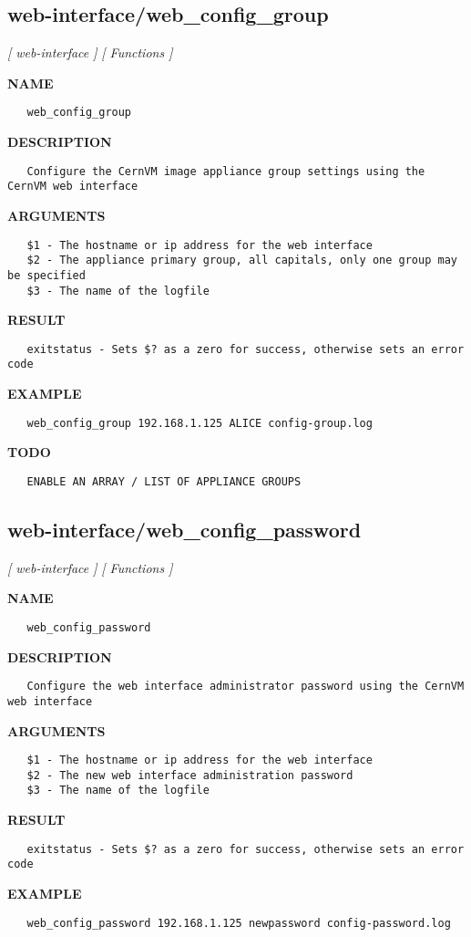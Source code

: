 \subsection{web-interface/web\_config\_group}
\textsl{[ web-interface ]}
\textsl{[ Functions ]}

\label{ch:robo73}
\label{ch:web_interface_web_config_group}
\textbf{NAME}
\begin{verbatim}
   web_config_group
\end{verbatim}
\textbf{DESCRIPTION}
\begin{verbatim}
   Configure the CernVM image appliance group settings using the CernVM web interface
\end{verbatim}
\textbf{ARGUMENTS}
\begin{verbatim}
   $1 - The hostname or ip address for the web interface
   $2 - The appliance primary group, all capitals, only one group may be specified
   $3 - The name of the logfile
\end{verbatim}
\textbf{RESULT}
\begin{verbatim}
   exitstatus - Sets $? as a zero for success, otherwise sets an error code
\end{verbatim}
\textbf{EXAMPLE}
\begin{verbatim}
   web_config_group 192.168.1.125 ALICE config-group.log
\end{verbatim}
\textbf{TODO}
\begin{verbatim}
   ENABLE AN ARRAY / LIST OF APPLIANCE GROUPS
\end{verbatim}
\newpage
\subsection{web-interface/web\_config\_password}
\textsl{[ web-interface ]}
\textsl{[ Functions ]}

\label{ch:robo74}
\label{ch:web_interface_web_config_password}
\textbf{NAME}
\begin{verbatim}
   web_config_password
\end{verbatim}
\textbf{DESCRIPTION}
\begin{verbatim}
   Configure the web interface administrator password using the CernVM web interface
\end{verbatim}
\textbf{ARGUMENTS}
\begin{verbatim}
   $1 - The hostname or ip address for the web interface
   $2 - The new web interface administration password
   $3 - The name of the logfile
\end{verbatim}
\textbf{RESULT}
\begin{verbatim}
   exitstatus - Sets $? as a zero for success, otherwise sets an error code
\end{verbatim}
\textbf{EXAMPLE}
\begin{verbatim}
   web_config_password 192.168.1.125 newpassword config-password.log
\end{verbatim}
\newpage
